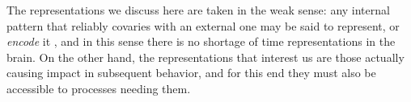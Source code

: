     The representations we discuss here are taken in the weak sense: any internal pattern that reliably covaries with an external one may be said to represent, or \textit{encode} it \cite{rosch1991embodied}, and in this sense there is no shortage of time representations in the brain. On the other hand, the representations that interest us are those actually causing impact in subsequent behavior, and for this end they must also be accessible to processes needing them.
    